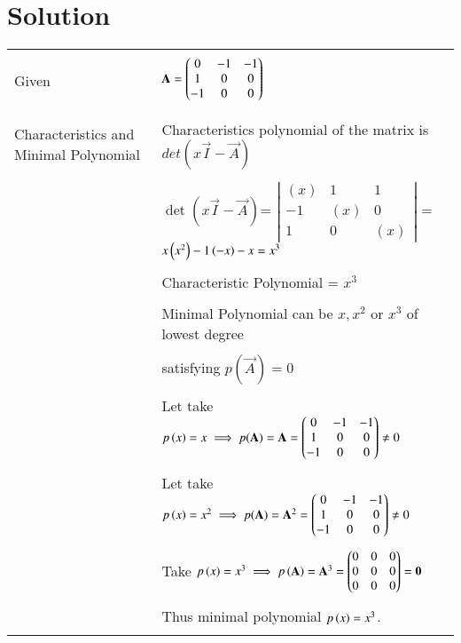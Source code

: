 \documentclass[journal,12pt]{IEEEtran}
\begin{document}
\section{\textbf{Solution}}
\renewcommand{\thetable}{2}
\begin{longtable}{|l|l|}
\hline
\multirow{3}{*}{Given} & \\
&$\mathbf{A}=\begin{pmatrix}0&-1&-1\\1&0&0\\-1&0&0\end{pmatrix}$\\
&\\
\hline


\multirow{3}{*}{Characteristics and Minimal Polynomial} & \\
&
Characteristics polynomial of the matrix  is $det(x\vec{I}-\vec{A})$\\ 
&\\
& $\det(x\vec{I}-\vec{A})$= $\left|
                \begin{array}{ccc}
                (x) & 1 & 1\\
                -1 & (x) & 0\\
                1 & 0 & (x)
                \end{array} \right|$ =$x\left(x^2\right)-1\left(-x\right)-x=x^3$\\
&\\
& Characteristic Polynomial = $x^3$\\
&\\
& Minimal Polynomial can be $x,x^2$ or $x^3$ of lowest degree\\
&\\
&satisfying $p(\vec{A})=0$    \\
&\\
&Let take $p\left(x\right)=x\implies p(\mathbf{A})=\mathbf{A}=\begin{pmatrix}0&-1&-1\\1&0&0\\-1&0&0\end{pmatrix}\neq0$\\
&\\
&Let take $p\left(x\right)=x^2\implies p(\mathbf{A})=\mathbf{A}^2=\begin{pmatrix}0&-1&-1\\1&0&0\\-1&0&0\end{pmatrix}\neq0$\\
&\\
&Take $p\left(x\right)=x^3\implies p\left(\mathbf{A}\right) =\mathbf{A}^3=\begin{pmatrix}0&0&0\\0&0&0\\0&0&0\end{pmatrix}=\mathbf{0}$\\
&\\
&Thus minimal polynomial $p\left(x\right)=x^3$.\\  
&\\

\end{longtable}
\end{document}
